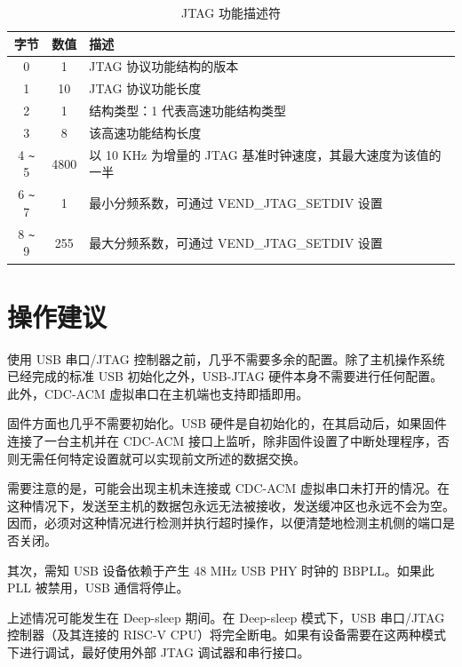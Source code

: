 \documentclass[main\_\_CN.tex]{subfiles}
\begin{document}
\begin{table}[H]
    \centering
    \caption{JTAG 功能描述符}
    \label{tab:usbserialjtag-capabilities-descriptor}
    \begin{tabular}{ |c|c|l| } 
    \hline
        \rowcolor{lightgray}
        \textbf{字节} & \textbf{数值} & \textbf{描述} \\\hline
        
        0 &    1 &     JTAG 协议功能结构的版本 \\\hline
        1 &    10 &    JTAG 协议功能长度 \\\hline
        2 &    1 &     结构类型：1 代表高速功能结构类型 \\\hline
        3 &    8 &     该高速功能结构长度 \\\hline
        4 \verb+~+ 5 &  4800 &  以 10 KHz 为增量的 JTAG 基准时钟速度，其最大速度为该值的一半\\\hline
        6 \verb+~+ 7 &  1 &     最小分频系数，可通过 VEND\_JTAG\_SETDIV 设置 \\\hline
        8 \verb+~+ 9 &  255 &   最大分频系数，可通过 VEND\_JTAG\_SETDIV 设置 \\\hline
    \end{tabular}
\end{table}


\section{操作建议}
\label{sec:usbserialjtag-recommended-operation}

使用 USB 串口/JTAG 控制器之前，几乎不需要多余的配置。除了主机操作系统已经完成的标准 USB 初始化之外，USB-JTAG 硬件本身不需要进行任何配置。此外，CDC-ACM 虚拟串口在主机端也支持即插即用。

固件方面也几乎不需要初始化。USB 硬件是自初始化的，在其启动后，如果固件连接了一台主机并在 CDC-ACM 接口上监听，除非固件设置了中断处理程序，否则无需任何特定设置就可以实现前文所述的数据交换。

需要注意的是，可能会出现主机未连接或 CDC-ACM 虚拟串口未打开的情况。在这种情况下，发送至主机的数据包永远无法被接收，发送缓冲区也永远不会为空。因而，必须对这种情况进行检测并执行超时操作，以便清楚地检测主机侧的端口是否关闭。

其次，需知 USB 设备依赖于产生 48 MHz USB PHY 时钟的 BBPLL。如果此 PLL 被禁用，USB 通信将停止。

上述情况可能发生在 Deep-sleep 期间。在 Deep-sleep 模式下，USB 串口/JTAG 控制器（及其连接的 RISC-V CPU）将完全断电。如果有设备需要在这两种模式下进行调试，最好使用外部 JTAG 调试器和串行接口。
\end{document}
